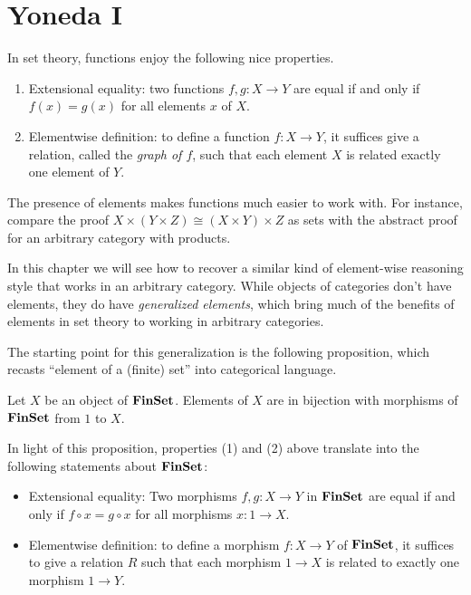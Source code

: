 \chapter{Yoneda I}

\noindent In set theory, functions enjoy the following nice properties.
\begin{enumerate}
\item Extensional equality: two functions \(f,g : X \to Y\)
  are equal if and only if \(f(x) = g(x)\) for all elements \(x\) of \(X\).
\item Elementwise definition:
  to define a function \(f : X \to Y\),
  it suffices give a relation,
  called the \emph{graph of \(f\)},
  such that each element \(X\)
  is related exactly one element of \(Y\).
\end{enumerate}
The presence of elements makes functions much easier to work with.
For instance, compare the proof \(X \times (Y \times Z) \cong (X\times Y) \times Z\)
as sets with the abstract proof for an arbitrary category with products.

In this chapter we will see how to recover a similar kind of element-wise reasoning
style that works in an arbitrary category.
While objects of categories don't have elements,
they do have \emph{generalized elements},
which bring much of the benefits of elements in set theory
to working in arbitrary categories.

The starting point for this generalization is the following
proposition, which recasts ``element of a (finite) set'' into categorical language.
\begin{proposition}
  Let \(X\) be an object of \(\mathbf{FinSet}\).
  Elements of \(X\) are in bijection
  with morphisms of \(\mathbf{FinSet}\)
  from \(1\) to \(X\).
\end{proposition}
In light of this proposition, properties (1) and (2)
above translate into the following statements about \(\mathbf{FinSet}\):
\begin{itemize}
\item Extensional equality:
  Two morphisms \(f,g : X \to Y\)
  in \(\mathbf{FinSet}\) are equal if and only if \(f \circ x = g \circ x\)
  for all morphisms \(x : 1 \to X\).
\item Elementwise definition:
  to define a morphism \(f : X \to Y\)
  of \(\mathbf{FinSet}\),
  it suffices to give a relation \(R\)
  such that each
  morphism \(1 \to X\)
  is related to exactly one morphism \(1 \to Y\).
\end{itemize}


